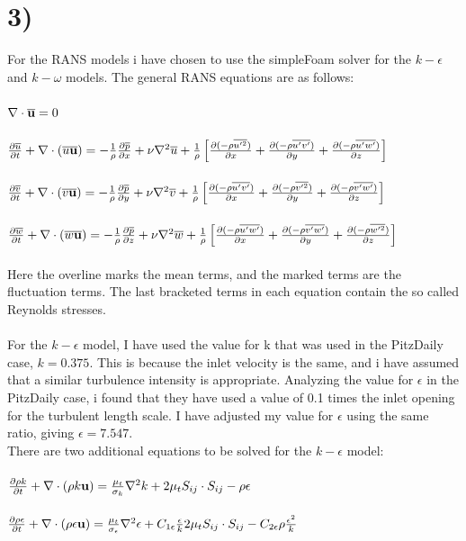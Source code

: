 \documentclass[a4paper,english,11pt,twoside]{article}
\begin{document}
\section*{3)}
For the RANS models i have chosen to use the simpleFoam solver for the $k-\epsilon$ and $k-\omega$ models. The general RANS equations are as follows:\\
\\
$\nabla\cdot\mathbf{\overline{u}} = 0$\\
\\
$\frac{\partial \overline{u}}{\partial t} + \nabla\cdot(\overline{u}\mathbf{\overline{u}}) = -\frac{1}{\rho}\frac{\partial \overline{p}}{\partial x} + \nu\nabla^2\overline{u} + \frac{1}{\rho}\left[\frac{\partial (-\rho\overline{u'^2})}{\partial x} + \frac{\partial (-\rho\overline{u'v'})}{\partial y} + \frac{\partial (-\rho\overline{u'w'})}{\partial z}\right]$
\\
\\
$\frac{\partial \overline{v}}{\partial t} + \nabla\cdot(\overline{v}\mathbf{\overline{u}}) = -\frac{1}{\rho}\frac{\partial \overline{p}}{\partial y} + \nu\nabla^2\overline{v} + \frac{1}{\rho}\left[\frac{\partial (-\rho\overline{u'v'})}{\partial x} + \frac{\partial (-\rho\overline{v'^2})}{\partial y} + \frac{\partial (-\rho\overline{v'w'})}{\partial z}\right]$
\\
\\
$\frac{\partial \overline{w}}{\partial t} + \nabla\cdot(\overline{w}\mathbf{\overline{u}}) = -\frac{1}{\rho}\frac{\partial \overline{p}}{\partial z} + \nu\nabla^2\overline{w} + \frac{1}{\rho}\left[\frac{\partial (-\rho\overline{u'w'})}{\partial x} + \frac{\partial (-\rho\overline{v'w'})}{\partial y} + \frac{\partial (-\rho\overline{w'^2})}{\partial z}\right]$
\\
\\
Here the overline marks the mean terms, and the marked terms are the fluctuation terms. The last bracketed terms in each equation contain the so called Reynolds stresses.\\
\\
For the $k-\epsilon$ model, I have used the value for k that was used in the PitzDaily case, $k = 0.375$. This is because the inlet velocity is the same, and i have assumed that a similar turbulence intensity is appropriate. Analyzing the value for $\epsilon$ in the PitzDaily case, i found that they have used a value of 0.1 times the inlet opening for the turbulent length scale. I have adjusted my value for $\epsilon$ using the same ratio, giving $\epsilon = 7.547$.\\
\newpage
There are two additional equations to be solved for the $k-\epsilon$ model:\\
\\
$\frac{\partial \rho k}{\partial t} + \nabla\cdot(\rho k \mathbf{u}) = \frac{\mu_t}{\sigma_k}\nabla^2k + 2\mu_t S_{ij}\cdot S_{ij} - \rho\epsilon$\\
\\
$\frac{\partial \rho \epsilon}{\partial t} + \nabla\cdot(\rho \epsilon \mathbf{u}) = \frac{\mu_t}{\sigma_{\epsilon}}\nabla^2\epsilon + C_{1\epsilon}\frac{\epsilon}{k}2\mu_t S_{ij}\cdot S_{ij} - C_{2\epsilon}\rho\frac{\epsilon^2}{k}$\\
\end{document}

